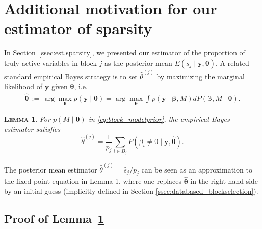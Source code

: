 \documentclass[bj,authoryear]{imsart}
\theoremstyle{plain}
\newtheorem{lem}[thm]{\textsc{Lemma}}
\newcommand{\bs}{\boldsymbol}
\begin{document}
\section{Additional motivation for our estimator of sparsity}\label{suppsec:ebayes} In Section~\ref{ssec:est.sparsity}, we presented our estimator of the proportion of truly active variables in block $j$ as the posterior mean $E(s_j \mid \bs y,\bs \theta)$. A related standard empirical Bayes strategy is to set $\hat{\theta}^{(j)}$ by %
maximizing the marginal likelihood of $\bs y$ given $\bs \theta$, i.e.
\begin{eqnarray}
\hat{\bs \theta}
\,:=\, \arg\max_{\bs \theta} p(\bs y \mid \bs \theta)=
\arg\max_{\bs \theta} \int p(\bs y \mid \bs \beta, M) d P(\bs \beta, M \mid \bs \theta).
\nonumber
\end{eqnarray}
\begin{lem}\label{lem:empiricalbayesinterpret} For $p(M \mid \bs \theta)$ in \eqref{eq:block_modelprior}, the empirical Bayes estimator satisfies 
$$\hat{\theta}^{(j)} = \frac{1}{p_j}\sum_{i\in B_j}P(\beta_i \neq 0 \mid \bs y,\hat{\bs \theta}).$$
\end{lem}
The posterior mean estimator $\hat{\theta}^{(j)}=\hat{s}_j/p_j$ can be seen as an approximation to the fixed-point equation in Lemma \ref{lem:empiricalbayesinterpret}, where one replaces $\hat{\bs \theta}$ in the right-hand side by an initial guess (implicitly defined in Section \ref{ssec:databased_blockselection}). 

\subsection{Proof of Lemma~\ref{lem:empiricalbayesinterpret}}
\end{document}
